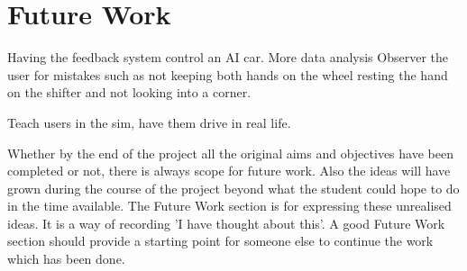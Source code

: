 \section{Future Work}

Having the feedback system control an AI car.
More data analysis
Observer the user for mistakes such as not keeping both hands on the wheel resting the hand on the shifter and not looking into a corner.

Teach users in the sim, have them drive in real life.

Whether by the end of the project all the original aims and objectives have been completed or not,
there is always scope for future work. Also the ideas will have grown during the course of the project
beyond what the student could hope to do in the time available. The Future Work section is for
expressing these unrealised ideas. It is a way of recording 'I have thought about this'. A good Future
Work section should provide a starting point for someone else to continue the work which has been
done. 